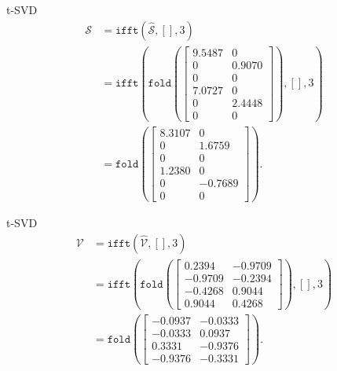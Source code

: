 \documentclass{beamer}
\begin{document}
\begin{frame}{t-SVD}
$$
\begin{aligned}
\mathcal{S}&=\texttt{ifft}(\hat{\mathcal{S}},[],3)\\
&=\texttt{ifft}(\texttt{fold}\left(
\left[\begin{array}{cc}
    9.5487  &       0\\
         0  &  0.9070\\
         0  &       0\\
\hline
    7.0727  &       0\\
         0  &  2.4448\\
         0  &       0
\end{array}\right]\right),[],3)\\
&=\texttt{fold}\left(
\left[\begin{array}{cc}
    8.3107  &       0\\
         0  &  1.6759\\
         0  &       0\\
\hline
    1.2380  &       0\\
         0  & -0.7689\\
         0  &       0
\end{array}\right]\right).
\end{aligned}
$$

\end{frame}

\begin{frame}{t-SVD}
$$
\begin{aligned}
\mathcal{V}&=\texttt{ifft}(\hat{\mathcal{V}},[],3)\\
&=\texttt{ifft}(\texttt{fold}\left(
\left[\begin{array}{cc}
    0.2394  & -0.9709\\
   -0.9709  & -0.2394\\
\hline
   -0.4268  &  0.9044\\
    0.9044  &  0.4268
\end{array}\right]\right),[],3)\\
&=\texttt{fold}\left(
\left[\begin{array}{cc}
   -0.0937  & -0.0333\\
   -0.0333  &  0.0937\\
\hline
    0.3331  & -0.9376\\
   -0.9376  & -0.3331
\end{array}\right]\right).
\end{aligned}
$$

\end{frame}
\end{document}
